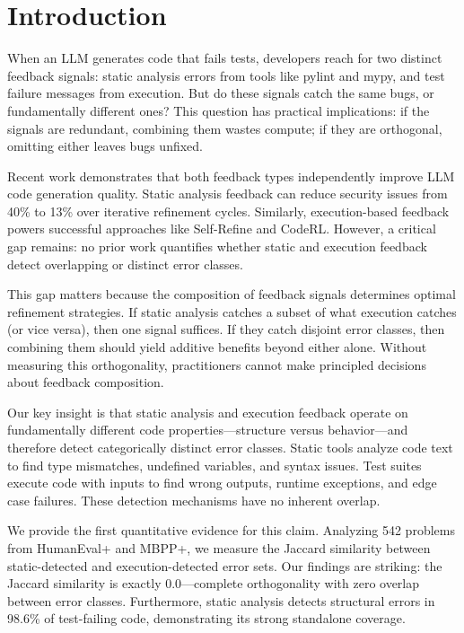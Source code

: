 \section{Introduction}

When an LLM generates code that fails tests, developers reach for two distinct feedback signals: static analysis errors from tools like pylint and mypy, and test failure messages from execution. But do these signals catch the same bugs, or fundamentally different ones? This question has practical implications: if the signals are redundant, combining them wastes compute; if they are orthogonal, omitting either leaves bugs unfixed.

Recent work demonstrates that both feedback types independently improve LLM code generation quality. Static analysis feedback can reduce security issues from 40\% to 13\% over iterative refinement cycles. Similarly, execution-based feedback powers successful approaches like Self-Refine and CodeRL. However, a critical gap remains: no prior work quantifies whether static and execution feedback detect overlapping or distinct error classes.

This gap matters because the composition of feedback signals determines optimal refinement strategies. If static analysis catches a subset of what execution catches (or vice versa), then one signal suffices. If they catch disjoint error classes, then combining them should yield additive benefits beyond either alone. Without measuring this orthogonality, practitioners cannot make principled decisions about feedback composition.

Our key insight is that static analysis and execution feedback operate on fundamentally different code properties---structure versus behavior---and therefore detect categorically distinct error classes. Static tools analyze code text to find type mismatches, undefined variables, and syntax issues. Test suites execute code with inputs to find wrong outputs, runtime exceptions, and edge case failures. These detection mechanisms have no inherent overlap.

We provide the first quantitative evidence for this claim. Analyzing 542 problems from HumanEval+ and MBPP+, we measure the Jaccard similarity between static-detected and execution-detected error sets. Our findings are striking: the Jaccard similarity is exactly 0.0---complete orthogonality with zero overlap between error classes. Furthermore, static analysis detects structural errors in 98.6\% of test-failing code, demonstrating its strong standalone coverage.

